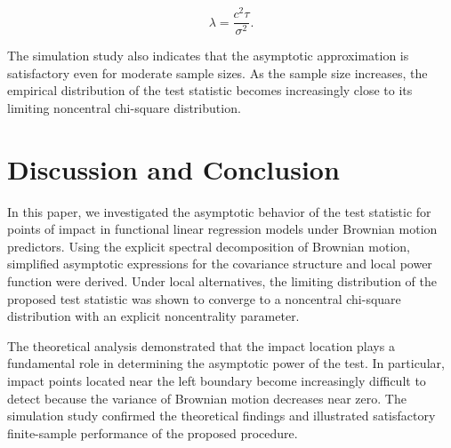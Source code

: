 \documentclass[twoside]{article}
\begin{document}
\[
\lambda=\frac{c^2\tau}{\sigma^2}.
\]

The simulation study also indicates that the asymptotic approximation is satisfactory even for moderate sample sizes. As the sample size increases, the empirical distribution of the test statistic becomes increasingly close to its limiting noncentral chi-square distribution.


\section*{Discussion and Conclusion}

In this paper, we investigated the asymptotic behavior of the test statistic for points of impact in functional linear regression models under Brownian motion predictors. Using the explicit spectral decomposition of Brownian motion, simplified asymptotic expressions for the covariance structure and local power function were derived. Under local alternatives, the limiting distribution of the proposed test statistic was shown to converge to a noncentral chi-square distribution with an explicit noncentrality parameter.

The theoretical analysis demonstrated that the impact location plays a fundamental role in determining the asymptotic power of the test. In particular, impact points located near the left boundary become increasingly difficult to detect because the variance of Brownian motion decreases near zero. The simulation study confirmed the theoretical findings and illustrated satisfactory finite-sample performance of the proposed procedure.
\end{document}

